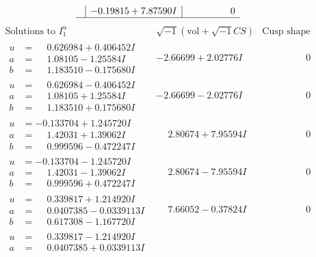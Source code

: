 \documentclass[1p]{elsarticle_modified}
\theoremstyle{definition}
\newcommand{\I}{\sqrt{-1}}
\begin{document}
$$\begin{array}{c|c|c}
 & -0.19815 + 7.87590 I & \phantom{-0.000000 } 0\\
 \hline 
 \end{array}$$\newpage$$\begin{array}{c|c|c}  
\text{Solutions to }I^u_{1}& \I (\text{vol} + \sqrt{-1}CS) & \text{Cusp shape}\\
 \hline 
\begin{aligned}
u &= \phantom{-}0.626984 + 0.406452 I \\
a &= \phantom{-}1.08105 - 1.25584 I \\
b &= \phantom{-}1.183510 - 0.175680 I\end{aligned}
 & -2.66699 + 2.02776 I & \phantom{-0.000000 } 0 \\ \hline\begin{aligned}
u &= \phantom{-}0.626984 - 0.406452 I \\
a &= \phantom{-}1.08105 + 1.25584 I \\
b &= \phantom{-}1.183510 + 0.175680 I\end{aligned}
 & -2.66699 - 2.02776 I & \phantom{-0.000000 } 0 \\ \hline\begin{aligned}
u &= -0.133704 + 1.245720 I \\
a &= \phantom{-}1.42031 + 1.39062 I \\
b &= \phantom{-}0.999596 - 0.472247 I\end{aligned}
 & \phantom{-}2.80674 + 7.95594 I & \phantom{-0.000000 } 0 \\ \hline\begin{aligned}
u &= -0.133704 - 1.245720 I \\
a &= \phantom{-}1.42031 - 1.39062 I \\
b &= \phantom{-}0.999596 + 0.472247 I\end{aligned}
 & \phantom{-}2.80674 - 7.95594 I & \phantom{-0.000000 } 0 \\ \hline\begin{aligned}
u &= \phantom{-}0.339817 + 1.214920 I \\
a &= \phantom{-}0.0407385 - 0.0339113 I \\
b &= \phantom{-}0.617308 - 1.167720 I\end{aligned}
 & \phantom{-}7.66052 - 0.37824 I & \phantom{-0.000000 } 0 \\ \hline\begin{aligned}
u &= \phantom{-}0.339817 - 1.214920 I \\
a &= \phantom{-}0.0407385 + 0.0339113 I \\

\end{aligned}
\end{array}$$
\end{document}
